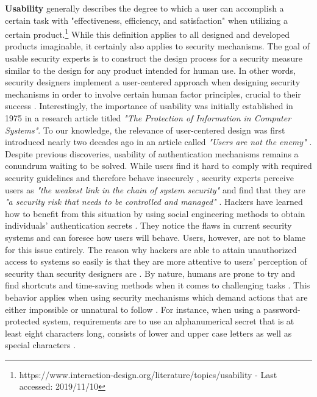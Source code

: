 \textbf{Usability} generally describes the degree to which a user can accomplish a certain task with "effectiveness, efficiency, and satisfaction" when utilizing a certain product.\footnote{https://www.interaction-design.org/literature/topics/usability - Last accessed: 2019/11/10} While this definition applies to all designed and developed products imaginable, it certainly also applies to security mechanisms. The goal of usable security experts is to construct the design process for a security measure similar to the design for any product intended for human use. In other words, security designers implement a user-centered approach when designing security mechanisms in order to involve certain human factor principles, crucial to their success \cite{Adams:1999:UE:322796.322806, sasse}. Interestingly, the importance of usability was initially established in 1975 in a research article titled \textit{"The Protection of Information in Computer Systems"}. To our knowledge, the relevance of user-centered design was first introduced nearly two decades ago in an article called \textit{"Users are not the enemy"} \cite{Adams:1999:UE:322796.322806}. \\

Despite previous discoveries, usability of authentication mechanisms remains a conundrum waiting to be solved. While users find it hard to comply with required security guidelines and therefore behave insecurely \cite{Adams:1999:UE:322796.322806, sasse}, security experts perceive users as \textit{"the weakest link in the chain of system security"} \cite{sasse} and find that they are \textit{"a security risk that needs to be controlled and managed"}  \cite{Adams:1999:UE:322796.322806}. Hackers have learned how to benefit from this situation by using social engineering methods to obtain individuals' authentication secrets \cite{Adams:1999:UE:322796.322806, sasse}. They notice the flaws in current security systems and can foresee how users will behave. Users, however, are not to blame for this issue entirely. The reason why hackers are able to attain unauthorized access to systems so easily is that they are more attentive to users' perception of security than security designers are \cite{Adams:1999:UE:322796.322806}. By nature, humans are prone to try and find shortcuts and time-saving methods when it comes to challenging tasks \cite{sasse}. This behavior applies when using security mechanisms which demand actions that are either impossible or unnatural to follow \cite{sasse}. For instance, when using a password-protected system, requirements are to use an alphanumerical secret that is at least eight characters long, consists of lower and upper case letters as well as special characters \cite{payne, sasse}. \\

